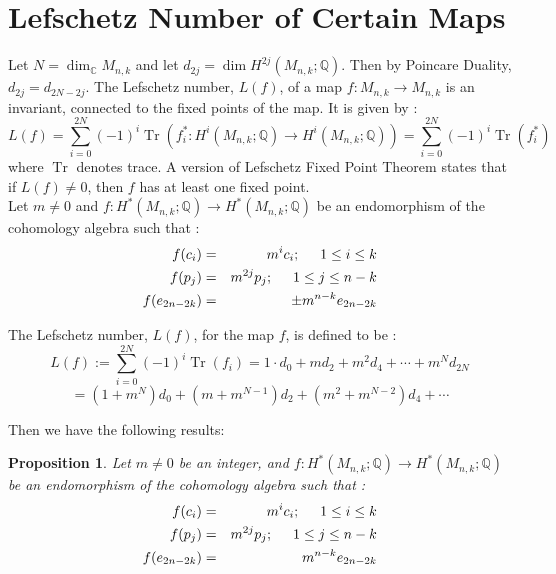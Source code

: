 \documentclass[a4paper,leqno,12pt]{amsart}
\theoremstyle{plain}
\newtheorem{prop}[thm]{Proposition}
\theoremstyle{definition}
\theoremstyle{remark}
\newcommand{\Tr}{\operatorname{Tr}}
\newcommand{\Q}{\mathbb{Q}}
\newcommand{\C}{\mathbb{C}}
\begin{document}
{\vspace{0.5cm}


\section{Lefschetz Number of Certain Maps}

\noindent
Let $N = \dim_{\C} M_{n,k}$ and let $d_{2j} = \dim H^{2j} (M_{n,k} ; \Q)$.  
Then by Poincare Duality,  $d_{2j} = d_{2N - 2j}$.  
The Lefschetz number,  $L(f)$, of a map $f \colon M_{n,k} \longrightarrow M_{n,k}$ is an invariant, connected to the fixed points of the map.  It is given by : 
\begin{displaymath}
L(f) = \sum_{i=0}^{2N} (-1)^{i} \Tr (f_{i}^{*} \colon H^{i} (M_{n,k} ; \Q) \longrightarrow H^{i} (M_{n,k} ; \Q)) =  \sum_{i=0}^{2N} (-1)^{i} \Tr (f_{i}^{*})
\end{displaymath}
where $\Tr$ denotes trace.  A version of Lefschetz Fixed Point Theorem states that if $L(f) \neq 0$,  then $f$ has at least one fixed point.  \\

\noindent
Let $m \neq 0$ and $f \colon H^{*} (M_{n,k} ; \Q) \longrightarrow H^{*} (M_{n,k} ; \Q)$ be an endomorphism of the cohomology algebra such that : 
\begin{eqnarray}
    f(c_{i}) &=& m^{i} c_{i} ; \hspace{0.5cm} 1 \leq i \leq k \nonumber \\ 
    f(p_{j}) &=& m^{2j} p_{j} ;  \hspace{0.5cm} 1 \leq j \leq n-k  \nonumber \\
    f(e_{2n-2k}) &=& \pm m^{n-k}e_{2n-2k} \nonumber
\end{eqnarray}

\noindent
 The Lefschetz number, $L(f)$,  for the map $f$,  is defined to be : 
 \begin{displaymath}
  L(f) :=  \sum_{i=0}^{2N} (-1)^{i} \Tr (f_{i})  
  = 1\cdot d_{0} + md_{2} + m^{2} d_{4} + \cdots + m^{N} d_{2N} 
  \end{displaymath}
  \begin{displaymath}
  = (1+m^{N}) d_{0} + (m + m^{N-1}) d_{2} + (m^{2} + m^{N-2}) d_{4} + \cdots 
\end{displaymath}

\noindent
Then we have the following results: 
\begin{prop}
Let $m \neq 0$  be an integer,  and $f \colon H^{*} (M_{n,k} ; \Q) \longrightarrow H^{*} (M_{n,k} ; \Q)$ be an endomorphism of the cohomology algebra such that : 
\begin{eqnarray}
    f(c_{i}) &=& m^{i} c_{i} ; \hspace{0.5cm} 1 \leq i \leq k \nonumber \\ 
    f(p_{j}) &=& m^{2j} p_{j} ;  \hspace{0.5cm} 1 \leq j \leq n-k  \nonumber \\
    f(e_{2n-2k}) &=& m^{n-k}e_{2n-2k} \nonumber
\end{eqnarray}


\end{prop}}
\end{document}
